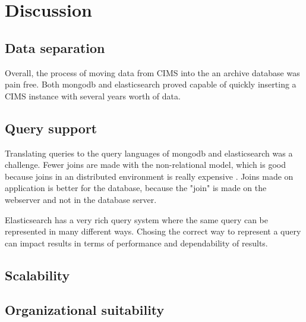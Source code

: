 \chapter{Discussion}
\label{chap:discussion}

\section{Data separation}
Overall, the process of moving data from CIMS into the an archive database was pain free. Both mongodb and elasticsearch proved capable of quickly inserting a CIMS instance with several years worth of data. 

\section{Query support}
Translating queries to the query languages of mongodb and elasticsearch was a challenge.
Fewer joins are made with the non-relational model, which is good because joins in an distributed environment is really expensive \cite{some source}. Joins made on application is better for the database, because the "join" is made on the webserver and not in the database server.

Elasticsearch has a very rich query system where the same query can be represented in many different ways. Chosing the correct way to represent a query can impact results in terms of performance and dependability of results. 

\section{Scalability}

\section{Organizational suitability}